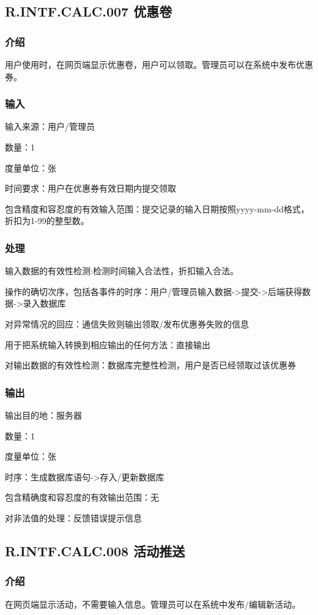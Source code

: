 \subsection{R.INTF.CALC.007 优惠卷}
\subsubsection{介绍}
用户使用时，在网页端显示优惠卷，用户可以领取。管理员可以在系统中发布优惠券。
\subsubsection{输入}
		输入来源：用户/管理员

		数量：1

		度量单位：张

		时间要求：用户在优惠券有效日期内提交领取

		包含精度和容忍度的有效输入范围：提交记录的输入日期按照yyyy-mm-dd格式，折扣为1-99的整型数。
\subsubsection{处理}
	输入数据的有效性检测:检测时间输入合法性，折扣输入合法。

	操作的确切次序，包括各事件的时序：用户/管理员输入数据->提交->后端获得数据->录入数据库

	对异常情况的回应：通信失败则输出领取/发布优惠券失败的信息

	用于把系统输入转换到相应输出的任何方法：直接输出

	对输出数据的有效性检测：数据库完整性检测，用户是否已经领取过该优惠券
\subsubsection{输出}
		输出目的地：服务器

		数量：1

		度量单位：张

		时序：生成数据库语句->存入/更新数据库

		包含精确度和容忍度的有效输出范围：无

		对非法值的处理：反馈错误提示信息




\subsection{R.INTF.CALC.008 活动推送}
\subsubsection{介绍}
在网页端显示活动，不需要输入信息。管理员可以在系统中发布/编辑新活动。
